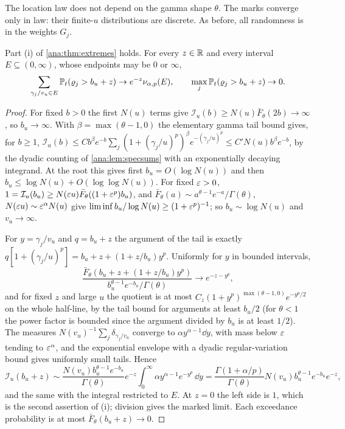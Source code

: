The location law does not depend on the gamma shape $\theta$. The marks converge only in law: their
finite-$u$ distributions are discrete. As before, all randomness is in the weights $G_j$.

\begin{lemma}\label{ana:lem:extintensity}
Part (i) of \cref{ana:thm:extremes} holds. For every $z\in\mathbb{R}$ and every interval $E\subseteq(0,\infty)$,
whose endpoints may be $0$ or $\infty$,
\[
 \sum_{\gamma_j/v_u\in E}\mathbb{P}_t(\varrho_j>b_u+z)\to e^{-z}\nu_{\alpha,p}(E),\qquad
 \max_j\mathbb{P}_t(\varrho_j>b_u+z)\to0 .
\]
\end{lemma}

\begin{proof}
For fixed $b>0$ the first $N(u)$ terms give $\mathcal I_u(b)\ge N(u)\bar F_\theta(2b)\to\infty$, so
$b_u\to\infty$. With $\beta=\max(\theta-1,0)$ the elementary gamma tail bound gives, for $b\ge1$,
$\mathcal I_u(b)\le Cb^\beta e^{-b}\sum_j(1+(\gamma_j/u)^p)^\beta e^{-(\gamma_j/u)^p}\le C'N(u)b^\beta e^{-b}$,
by the dyadic counting of \cref{ana:lem:specsums} with an exponentially decaying integrand. At the root
this gives first $b_u=O(\log N(u))$ and then $b_u\le\log N(u)+O(\log\log N(u))$. For fixed $\varepsilon>0$,
$1=\mathcal I_u(b_u)\ge N(\varepsilon u)\bar F_\theta((1+\varepsilon^p)b_u)$, and
$\bar F_\theta(a)\sim a^{\theta-1}e^{-a}/\Gamma(\theta)$, $N(\varepsilon u)\sim\varepsilon^\alpha N(u)$ give
$\liminf b_u/\log N(u)\ge(1+\varepsilon^p)^{-1}$; so $b_u\sim\log N(u)$ and $v_u\to\infty$.

For $y=\gamma_j/v_u$ and $q=b_u+z$ the argument of the tail is exactly
$q[1+(\gamma_j/u)^p]=b_u+z+(1+z/b_u)y^p$. Uniformly for $y$ in bounded intervals,
\[
 \frac{\bar F_\theta(b_u+z+(1+z/b_u)y^p)}{b_u^{\theta-1}e^{-b_u}/\Gamma(\theta)}\to e^{-z-y^p},
\]
and for fixed $z$ and large $u$ the quotient is at most $C_z(1+y^p)^{\max(\theta-1,0)}e^{-y^p/2}$ on the
whole half-line, by the tail bound for arguments at least $b_u/2$ (for $\theta<1$ the power factor is
bounded since the argument divided by $b_u$ is at least $1/2$). The measures
$N(v_u)^{-1}\sum_j\delta_{\gamma_j/v_u}$ converge to $\alpha y^{\alpha-1}\dd y$, with mass below $\varepsilon$
tending to $\varepsilon^\alpha$, and the exponential envelope with a dyadic regular-variation bound gives
uniformly small tails. Hence
\[
 \mathcal I_u(b_u+z)\sim\frac{N(v_u)b_u^{\theta-1}e^{-b_u}}{\Gamma(\theta)}e^{-z}
 \int_0^\infty\alpha y^{\alpha-1}e^{-y^p}\,\dd y
 =\frac{\Gamma(1+\alpha/p)}{\Gamma(\theta)}N(v_u)b_u^{\theta-1}e^{-b_u}e^{-z},
\]
and the same with the integral restricted to $E$. At $z=0$ the left side is $1$, which is the second
assertion of (i); division gives the marked limit. Each exceedance probability is at most
$\bar F_\theta(b_u+z)\to0$.
\end{proof}

